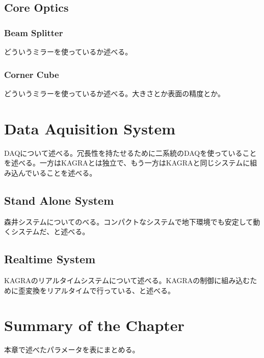 \subsection{Core Optics}
\subsubsection{Beam Splitter}
どういうミラーを使っているか述べる。
\subsubsection{Corner Cube}
どういうミラーを使っているか述べる。大きさとか表面の精度とか。




\section{Data Aquisition System} %
DAQについて述べる。冗長性を持たせるために二系統のDAQを使っていることを述べる。一方はKAGRAとは独立で、もう一方はKAGRAと同じシステムに組み込んでいることを述べる。
\subsection{Stand Alone System}
森井システムについてのべる。コンパクトなシステムで地下環境でも安定して動くシステムだ、と述べる。
\subsection{Realtime System}
KAGRAのリアルタイムシステムについて述べる。KAGRAの制御に組み込むために歪変換をリアルタイムで行っている、と述べる。




\section{Summary of the Chapter} %
本章で述べたパラメータを表にまとめる。
